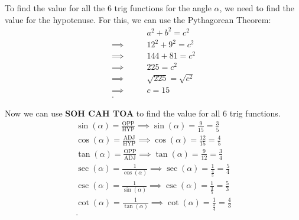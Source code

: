\begin{solution}
	\label{sol:find_value_for_all_six_trigonometric_functions}

	To find the value for all the $6$ trig functions for the angle $\alpha$, we
	need to find the value for the hypotenuse. For this, we can use the
	Pythagorean Theorem:
	\begin{align*}
		\qquad         & a^{2} + b^{2} = c^{2}     \\
		\implies\qquad & 12^{2} + 9^{2} = c^{2}    \\
		\implies\qquad & 144 + 81 = c^{2}          \\
		\implies\qquad & 225 = c^{2}               \\
		\implies\qquad & \sqrt{225} = \sqrt{c^{2}} \\
		\implies\qquad & c = 15                    \\
		.\end{align*}

	Now we can use \textbf{SOH CAH TOA} to find the value for all $6$ trig
	functions.
	\begin{align*}
		\sin (\alpha) = \frac{\textrm{OPP}}{\textrm{HYP}}
		\implies \sin (\alpha) = \frac{9}{15} = \frac{3}{5}          \\
		\cos (\alpha) = \frac{\textrm{ADJ}}{\textrm{HYP}}
		\implies \cos (\alpha) = \frac{12}{15} = \frac{4}{5}         \\
		\tan (\alpha) = \frac{\textrm{OPP}}{\textrm{ADJ}}
		\implies \tan (\alpha) = \frac{9}{12} = \frac{3}{4}          \\
		\sec (\alpha) = \frac{1}{\cos (\alpha)}
		\implies \sec (\alpha) = \frac{1}{\frac{4}{5}} = \frac{5}{4} \\
		\csc (\alpha) = \frac{1}{\sin (\alpha)}
		\implies \csc (\alpha) = \frac{1}{\frac{3}{5}} = \frac{5}{3} \\
		\cot (\alpha) = \frac{1}{\tan (\alpha)}
		\implies \cot (\alpha) = \frac{1}{\frac{3}{4}} = \frac{4}{3} \\
		.\end{align*}
\end{solution}

